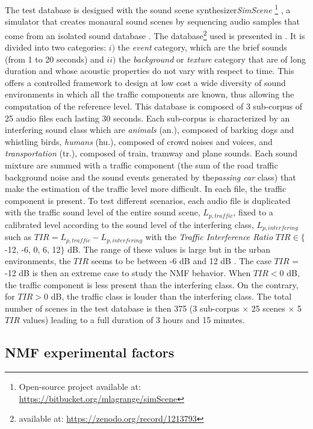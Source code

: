 \documentclass[12pt,english,twoside]{article}
\begin{document}
The test database is designed with the sound scene synthesizer\textit{SimScene} \footnote{Open-source project available at: \url{https://bitbucket.org/mlagrange/simScene}} \cite{rossignol_simscene_2015}, a simulator that creates monaural sound scenes by sequencing audio samples that come from an isolated sound database \cite{lagrange2015evaluation}. 
The database\footnote{available at: \url{https://zenodo.org/record/1213793}} used is presented in \cite{gloaguen2017creation}. 
It is divided into two categories: $i)$ the \textit{event} category, which are the brief sounds (from 1 to 20 seconds) and $ii)$ the \textit{background} or \textit{texture} category that are of long duration and whose acoustic properties do not vary with respect to time. This offers a controlled framework to design at low cost a wide diversity of sound environments in which all the traffic components are known, thus allowing the computation of the reference level.
This database is composed of 3 sub-corpus of 25 audio files each lasting 30 seconds. Each sub-corpus is characterized by an interfering sound class which are \textit{animals} (an.), composed of barking dogs and whistling birds, \textit{humans} (hu.), composed of crowd noises and voices, and \textit{transportation} (tr.), composed of train, tramway and plane sounds. Each sound mixture are summed  with a traffic component (the sum of the road traffic background noise and the sound events generated by the\textit{passing car} class) that make the estimation of the traffic level more difficult. In each file, the traffic component is present. To test different scenarios, each audio file is duplicated with the traffic sound level of the entire sound scene, $L_{p,traffic}$, fixed to a calibrated level according to the sound level of the interfering class, $L_{p,interfering}$ such as $
TIR = L_{p,traffic}-L_{p,interfering}$ with the \textit{Traffic Interference Ratio} $TIR \in \lbrace$-12, -6, 0, 6, 12$\rbrace$ dB.
The range of these values is large but in the urban environments, the $TIR$ seems to be between -6 dB and 12 dB \cite{gloaguen2017creation}. The case $TIR$ = -12 dB is then an extreme case to study the NMF behavior. When $TIR < 0$ dB, the traffic component is less present than the interfering class. On the contrary, for $TIR > 0$ dB, the traffic class is louder than the interfering class. The total number of scenes in the test database is then 375 (3 sub-corpus $\times$ 25 scenes $\times$  5 $TIR$ values) leading to a full duration of 3 hours and 15 minutes.

\subsection{NMF experimental factors}
\end{document}
